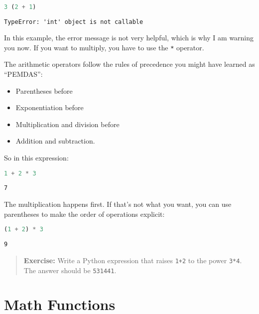 \documentclass[
]{book}
\newcommand{\passthrough}[1]{#1}
\providecommand{\tightlist}{%
  \setlength{\itemsep}{0pt}\setlength{\parskip}{0pt}}
\begin{document}
\begin{lstlisting}[language=Python]
%%expect TypeError

3 (2 + 1)
\end{lstlisting}

\begin{lstlisting}
TypeError: 'int' object is not callable
\end{lstlisting}

In this example, the error message is not very helpful, which is why I
am warning you now. If you want to multiply, you have to use the
\passthrough{\lstinline!*!} operator.

The arithmetic operators follow the rules of precedence you might have
learned as ``PEMDAS'':

\begin{itemize}
\tightlist
\item
  Parentheses before
\item
  Exponentiation before
\item
  Multiplication and division before
\item
  Addition and subtraction.
\end{itemize}

So in this expression:

\begin{lstlisting}[language=Python]
1 + 2 * 3
\end{lstlisting}

\begin{lstlisting}
7
\end{lstlisting}

The multiplication happens first. If that's not what you want, you can
use parentheses to make the order of operations explicit:

\begin{lstlisting}[language=Python]
(1 + 2) * 3
\end{lstlisting}

\begin{lstlisting}
9
\end{lstlisting}

\begin{quote}
\textbf{Exercise:} Write a Python expression that raises
\passthrough{\lstinline!1+2!} to the power
\passthrough{\lstinline!3*4!}. The answer should be
\passthrough{\lstinline!531441!}.
\end{quote}

\section{Math Functions}\label{math-functions}
\end{document}
